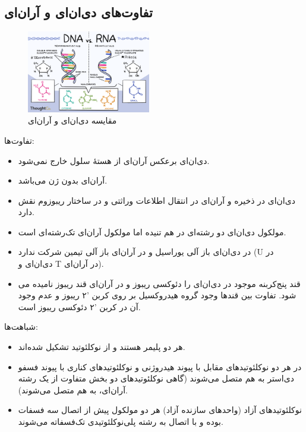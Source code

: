 \documentclass[12pt,a4paper,BCOR=.7cm,headsepline,bibliography=totoc]{report}
\begin{document}
\subsection{تفاوت‌های دی‌ان‌ای و آران‌ای}
{\begin{figure}
\centering
\includegraphics[width=0.48\textwidth, ]{pictures/dnarna.png}
\vspace{-13pt}
\caption{
مقایسه دی‌ان‌ای و آران‌ای \cite{graph2}
}\label{wrap-fig:3}
\end{figure}
تفاوت‌ها:
\begin{itemize}
\item دی‌ان‌ای برعکس آر‌ان‌ای از هستهٔ سلول خارج نمی‌شود.
\item آر‌ان‌ای بدون ژن می‌باشد.
\item دی‌ان‌ای در ذخیره و آر‌ان‌ای در انتقال اطلاعات وراثتی و در ساختار ریبوزوم نقش دارد.
\item مولکول دی‌ان‌ای دو رشته‌ای در هم تنیده اما مولکول آر‌ان‌ای تک‌رشته‌ای است.
\item 
در دی‌ان‌ای باز آلی یوراسیل و در آر‌ان‌ای باز آلی تیمین شرکت ندارد (U در دی‌ان‌ای و T در آر‌ان‌ای).
\item
قند پنج‌کربنه موجود در دی‌ان‌ای را دئوکسی ریبوز و در آر‌ان‌ای قند ریبوز نامیده می شود. تفاوت بین قندها وجود گروه هیدروکسیل بر روی کربن '۲ ریبوز و عدم وجود آن در کربن '۲ دئوکسی ریبوز است.

\end{itemize}
شباهت‌ها:
\begin{itemize}
\item هر دو پلیمر هستند و از نوکلئوتید تشکیل شده‌اند.
\item در هر دو نوکلئوتیدهای مقابل با پیوند هیدروژنی و نوکلئوتیدهای کناری با پیوند فسفو دی‌استر به هم متصل می‌شوند (گاهی نوکلئوتیدهای دو بخش متفاوت از یک رشته آران‌ای، به هم متصل می‌شوند).
\item نوکلئوتیدهای آزاد (واحدهای سازنده آزاد) هر دو مولکول پیش از اتصال سه فسفات بوده و با اتصال به رشته پلی‌نوکلئوتیدی تک‌فسفاته می‌شوند.

\end{itemize}}
\end{document}
